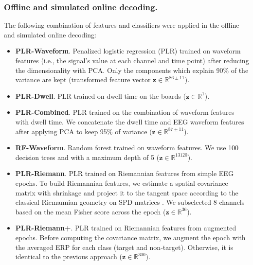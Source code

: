 \documentclass[12pt]{iopart}
\begin{document}
\subsubsection*{Offline and simulated online decoding.}
The following combination of features and classifiers were applied in the offline and simulated online decoding:
\begin{itemize}
    \item \textbf{PLR-Waveform}. Penalized logistic regression (PLR) trained on waveform features (i.e., the signal's
        value at each channel and time point) after reducing
        the dimensionality with PCA. Only the components which explain 90\% of the variance
        are kept (transformed feature vector $\mathbf{z} \in \mathbb{R}^{86 \pm 11}$).
    \item \textbf{PLR-Dwell}. PLR trained on dwell time on the boards ($\mathbf{z} \in \mathbb{R}^{1}$).
    \item \textbf{PLR-Combined}. PLR trained on the combination of waveform features with dwell time. We concatenate
        the dwell time and EEG waveform features after applying PCA to keep 95\% of variance ($\mathbf{z} \in \mathbb{R}^{87 \pm 11}$). 

    \item \textbf{RF-Waveform}. Random forest trained on waveform features. We use 100 decision trees and
        with a maximum depth of 5 ($\mathbf{z} \in \mathbb{R}^{13120}$).
    \item \textbf{PLR-Riemann}. PLR trained on Riemannian features from simple EEG epochs.
        To build Riemannian features, we
        estimate a spatial covariance matrix with shrinkage and project it
        to the tangent space according to the classical Riemannian geometry on SPD matrices
        \cite{barachant_multiclass_2012}.
        We subselected 8 channels based on the mean Fisher score across the epoch
        ($\mathbf{z} \in \mathbb{R}^{36}$).
    \item \textbf{PLR-Riemann+}. PLR trained on Riemannian features from augmented epochs.
        Before computing the covariance matrix, we augment the epoch with the averaged ERP
        for each class (target and non-target). Otherwise, it is identical to the previous
        approach ($\mathbf{z} \in \mathbb{R}^{300}$).
\end{itemize}
\end{document}
